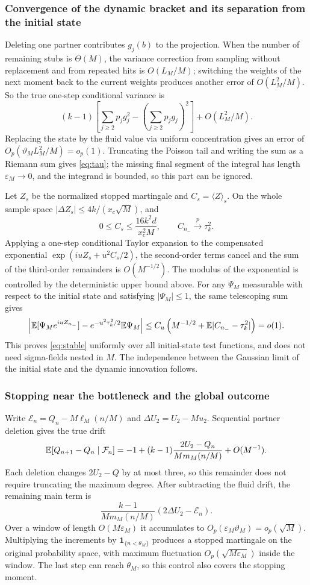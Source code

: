\subsubsection{Convergence of the dynamic bracket and its separation from the initial state}
Deleting one partner contributes $g_j(b)$ to the projection. When the number of remaining stubs is
$\Theta(M)$, the variance correction from sampling without replacement and from repeated hits is
$O(L_M/M)$; switching the weights of the next moment back to the current weights produces another error of
$O(L_M^2/M)$. So the true one-step conditional variance is
\[
(k-1)\left[\sum_{j\ge2}p_jg_j^2-
 \left(\sum_{j\ge2}p_jg_j\right)^2\right]+O(L_M^2/M).
\]
Replacing the state by the fluid value via uniform concentration gives an error of
$O_p(\vartheta_M L_M^2/M)=o_p(1)$. Truncating the Poisson tail and writing the sum as a Riemann sum gives
\eqref{eq:tau}; the missing final segment of the integral has length $\varepsilon_M\to0$, and the integrand
is bounded, so this part can be ignored.

Let $Z_s$ be the normalized stopped martingale and $C_s=\langle Z\rangle_s$. On the whole sample space
$|\Delta Z_s|\le4k/(x_c\sqrt M)$, and
\[
0\le C_s\le\frac{16k^2d}{x_c^2M},\qquad C_{n_-}\xrightarrow p\tau_k^2.
\]
Applying a one-step conditional Taylor expansion to the compensated exponential $\exp(iuZ_s+u^2C_s/2)$, the
second-order terms cancel and the sum of the third-order remainders is $O(M^{-1/2})$. The modulus of the
exponential is controlled by the deterministic upper bound above. For any $\Psi_M$ measurable with respect to
the initial state and satisfying $|\Psi_M|\le1$, the same telescoping sum gives
\[
\left|\mathbb E[\Psi_Me^{iuZ_{n_-}}]
-e^{-u^2\tau_k^2/2}\mathbb E \Psi_M\right|
\le C_u\left(M^{-1/2}+\mathbb E|C_{n_-}-\tau_k^2|\right)=o(1).
\]
This proves \eqref{eq:stable} uniformly over all initial-state test functions, and does not need sigma-fields
nested in $M$. The independence between the Gaussian limit of the initial state and the dynamic innovation
follows.

\subsubsection{Stopping near the bottleneck and the global outcome}
Write $\mathcal E_n=Q_n-M\ell_M(n/M)$ and $\Delta U_2=U_2-Mu_2$. Sequential partner deletion gives the true
drift
\[
\mathbb E[Q_{n+1}-Q_n\mid\mathcal F_n]
=-1+(k-1)\frac{2U_2-Q_n}{Mm_M(n/M)}+O(M^{-1}).
\]
Each deletion changes $2U_2-Q$ by at most three, so this remainder does not require truncating the maximum
degree. After subtracting the fluid drift, the remaining main term is
\[
\frac{k-1}{Mm_M(n/M)}(2\Delta U_2-\mathcal E_n).
\]
Over a window of length $O(M\varepsilon_M)$ it accumulates to $O_p(\varepsilon_M\vartheta_M)=o_p(\sqrt M)$.
Multiplying the increments by $\mathbf1_{\{n<\theta_M\}}$ produces a stopped martingale on the original
probability space, with maximum fluctuation $O_p(\sqrt{M\varepsilon_M})$ inside the window. The last step can
reach $\theta_M$, so this control also covers the stopping moment.


